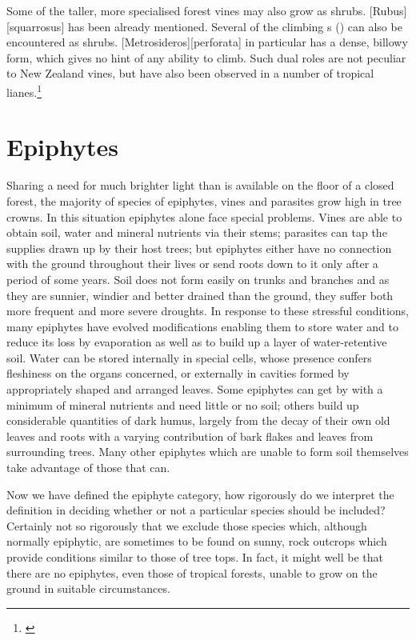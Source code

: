 Some of the taller, more specialised forest vines may also grow as shrubs. [Rubus][squarrosus] has been already mentioned.
Several of the climbing s () can also be encountered as shrubs. [Metrosideros][perforata] in particular has a dense, billowy form, which gives no hint of any ability to climb.
Such dual roles are not peculiar to New Zealand vines, but have also been observed in a number of tropical lianes.\footnote{\cite{richards1952tropical}}

\section{Epiphytes}

Sharing a need for much brighter light than is available on the floor of a closed forest, the majority of species of epiphytes, vines and parasites grow high in tree crowns.
In this situation epiphytes alone face special problems.
Vines are able to obtain soil, water and mineral nutrients via their stems; parasites can tap the supplies drawn up by their host trees; but epiphytes either have no connection with the ground throughout their lives or send roots down to it only after a period of some years.
Soil does not form easily on trunks and branches and as they are sunnier, windier and better drained than the ground, they suffer both more frequent and more severe droughts.
In response to these stressful conditions, many epiphytes have evolved modifications enabling them to store water and to reduce its loss by evaporation as well as to build up a layer of water-retentive soil.
Water can be stored internally in special cells, whose presence confers fleshiness on the organs concerned, or externally in cavities formed by appropriately shaped and arranged leaves.
Some epiphytes can get by with a minimum of mineral nutrients and need little or no soil; others build up considerable quantities of dark humus, largely from the decay of their own old leaves and roots with a varying contribution of bark flakes and leaves from surrounding trees.
Many other epiphytes which are unable to form soil themselves take advantage of those that can.

Now we have defined the epiphyte category, how rigorously do we interpret the definition in deciding whether or not a particular species should be included? Certainly not so rigorously that we exclude those species which, although normally epiphytic, are sometimes to be found on sunny, rock outcrops which provide conditions similar to those of tree tops.
In fact, it might well be that there are no epiphytes, even those of tropical forests, unable to grow on the ground in suitable circumstances.

